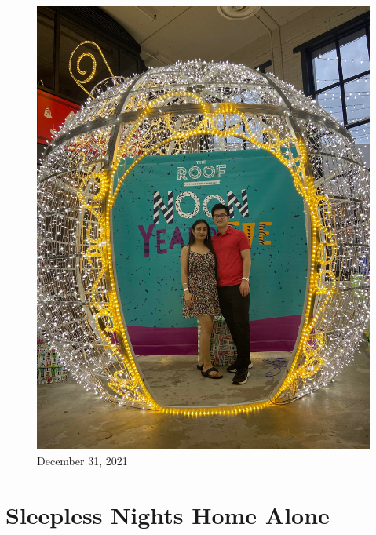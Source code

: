 \documentclass[
]{book}
\begin{document}
\begin{figure}
\centering
\includegraphics[width=5.20833in,height=\textheight]{mimages/15 12-31-2021.jpg}
\caption{December 31, 2021}
\end{figure}

\hypertarget{sleepless-nights-home-alone}{%
\chapter{Sleepless Nights Home Alone}\label{sleepless-nights-home-alone}}
\end{document}
